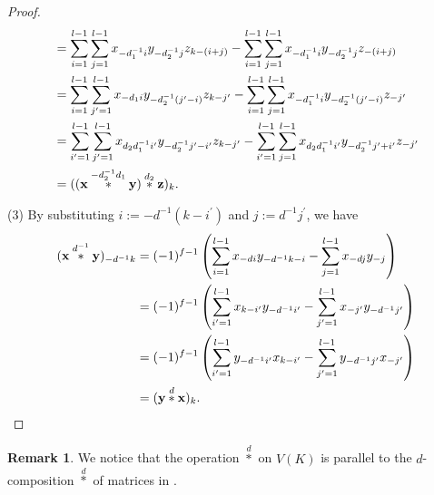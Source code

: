 \documentclass[a4paper, 11pt]{amsart}
\theoremstyle{plain}
\theoremstyle{definition}
\newtheorem{remark}[thm]{Remark}
\numberwithin{equation}{section}
\begin{document}
\begin{proof}
\begin{align*}
&=\sum_{i=1}^{l-1}\sum_{j=1}^{l-1}x_{-d_1^{-1}i}y_{-d_2^{-1}j}z_{k-(i+j)} - \sum_{i=1}^{l-1}\sum_{j=1}^{l-1}x_{-d_1^{-1}i} y_{-d_2^{-1}j}z_{-(i+j)}\\
&=\sum_{i=1}^{l-1}\sum_{j^\prime=1}^{l-1}x_{-d_1i}y_{-d_2^{-1}(j^\prime-i)}z_{k-j^\prime} - \sum_{i=1}^{l-1}\sum_{j=1}^{l-1}x_{-d_1^{-1}i} y_{-d_2^{-1}(j^\prime-i)}z_{-j^\prime}\\
&=\sum_{i^\prime=1}^{l-1}\sum_{j^\prime=1}^{l-1}x_{d_2d_1^{-1}i^\prime}y_{-d_2^{-1}j^\prime-i^\prime}z_{k-j^\prime} - \sum_{i^\prime=1}^{l-1}\sum_{j=1}^{l-1}x_{d_2d_1^{-1}i^\prime} y_{-d_2^{-1}j^\prime + i^\prime}z_{-j^\prime}\\
&=(({\bf x}\overset{-d_2^{-1}d_1}{\ast}{\bf y})\overset{d_2}{\ast}{\bf z})_k.
\end{align*}

(3) By substituting $i:=-d^{-1}(k-i^\prime)$ and $j:=d^{-1}j^\prime$, we have
\begin{align*}
({\bf x}\overset{d^{-1}}{\ast}{\bf y})_{-d^{-1}k}&=
 (-1)^{f-1}\left( \sum_{i=1}^{l-1}x_{-di}y_{-d^{-1}k-i} - \sum_{j=1}^{l-1}x_{-dj}y_{-j} \right)\\
 &= (-1)^{f-1}\left( \sum_{i^\prime=1}^{l-1}x_{k-i^\prime}y_{-d^{-1}i^\prime} - \sum_{j^\prime=1}^{l-1}x_{-j^\prime}y_{-d^{-1}j^\prime} \right)\\
 &= (-1)^{f-1}\left( \sum_{i^\prime=1}^{l-1}y_{-d^{-1}i^\prime}x_{k-i^\prime} - \sum_{j^\prime=1}^{l-1}y_{-d^{-1}j^\prime}x_{-j^\prime} \right)\\
 &= ({\bf y}\overset{d}{\ast}{\bf x})_{k}.
\end{align*}
\end{proof}

\begin{remark}
We notice that the operation $\overset{d}{\ast}$ on $V(K)$ is parallel to the $d$-composition $\overset{d}{\ast}$ of matrices in \cite[Section 3]{HK22}. 
\end{remark}
\end{document}
